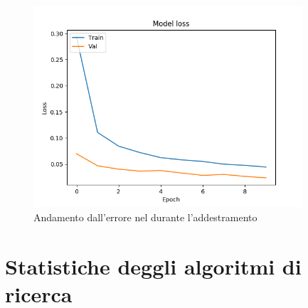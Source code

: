 \documentclass{article}
\begin{document}
	\begin{figure}[H]
		\centering
		\includegraphics[width=10cm]{./images/loss.png}
		\caption{Andamento dall'errore nel durante l'addestramento}
		\label{fig:loss}
	\end{figure}



	\let\footnoterule\relax
	\section{Statistiche deggli algoritmi di ricerca}
\end{document}
